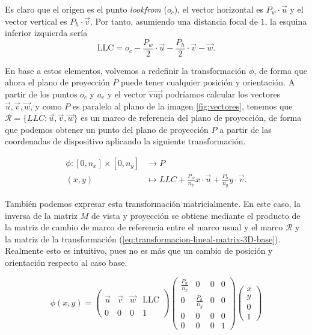 Es claro que el origen es el punto \textit{lookfrom} ($o_c$), el vector horizontal es $P_w\cdot \vec u$ y el vector vertical es $P_h\cdot \vec v$. Por tanto, asumiendo una distancia focal de $1$, la esquina inferior izquierda sería
$$
\mathrm{LLC} = o_c - \frac{P_w}{2}\cdot \vec u - \frac{P_h}{2}\cdot \vec v - \vec w.
$$

En base a estos elementos, volvemos a redefinir la transformación $\phi$, de forma que ahora el plano de proyección $P$ puede tener cualquier posición y orientación. A partir de los puntos $o_c$ y $a_c$ y el vector $\overrightarrow{\mathrm{vup}}$ podríamos calcular los vectores $\vec u, \vec v, \vec w$, y como $P$ es paralelo al plano de la imagen \ref{fig:vectores}, tenemos que $\mathcal{R}=\{LLC; \vec u, \vec v, \vec w \}$ es un marco de referencia del plano de proyección, de forma que podemos obtener un punto del plano de proyección $P$ a partir de las coordenadas de dispositivo aplicando la siguiente transformación.

\begin{equation}
    \label{eq:transformacion-lineal-6}
    \begin{split}
        \phi : [0,n_x]\times [0,n_y] & \longrightarrow P \\
        (x,y) & \longmapsto LLC + \frac{P_w}{n_x}x\cdot \vec u + \frac{P_h}{n_y}y\cdot\vec v.
    \end{split}
\end{equation}

También podemos expresar esta transformación matricialmente. En este caso, la inversa de la matriz $M$ de vista y proyección se obtiene mediante el producto de la matriz de cambio de marco de referencia entre el marco usual y el marco $\mathcal{R}$ y la matriz de la transformación (\ref{eq:transformacion-lineal-matrix-3D-base}). Realmente esto es intuitivo, pues no es más que un cambio de posición y orientación respecto al caso base.

\begin{equation}
    \label{eq:transformacion-lineal-matrix-3D-camara}
    \phi(x,y) = \left(\begin{array}{ccc|c}
        &  &  &  \\
        \vec u & \vec v & \vec w & \mathrm{LLC} \\
        &  &  &  \\ \hline
        0 & 0 & 0 & 1
    \end{array}\right)\left(\begin{array}{ccc|c}
        \frac{P_w}{n_x} & 0 & 0 & 0 \\
        0 & \frac{P_h}{n_y} & 0 & 0 \\
        0 & 0 & 0 & 0 \\ \hline
        0 & 0 & 0 & 1
    \end{array}\right)\left(
        \begin{array}{c}
            x \\ y \\ 0 \\ \hline 1
        \end{array}\right)
\end{equation}

